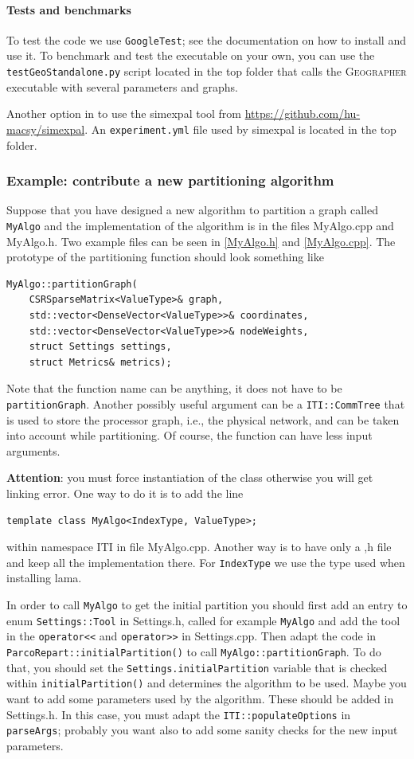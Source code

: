 \documentclass[a4paper,10pt]{article}
\newcommand{\geo}{\textsc{Geographer} }
\newcommand{\att}{\textbf{Attention}: }
\newcommand{\MI}[1]{\texttt{#1}}
\begin{document}
\paragraph{Tests and benchmarks}
To test the code we use \texttt{GoogleTest}; see the documentation on how to install and use it.
To benchmark and test the executable on your own, you can use the \texttt{testGeoStandalone.py}
script located in the top folder that calls the \geo executable with several parameters
and graphs.

Another option in to use the simexpal tool from \url{https://github.com/hu-macsy/simexpal}.
An \texttt{experiment.yml} file used by simexpal is located in the top folder.


\subsubsection*{Example: contribute a new partitioning algorithm}

Suppose that you have designed a new algorithm to partition a graph called \MI{MyAlgo}
and the implementation of the algorithm is in the files MyAlgo.cpp and MyAlgo.h. Two example files
can be seen in \cref{MyAlgo.h} and \cref{MyAlgo.cpp}.
The prototype of the partitioning function should look something like
\begin{verbatim}
MyAlgo::partitionGraph( 
    CSRSparseMatrix<ValueType>& graph,
    std::vector<DenseVector<ValueType>>& coordinates,
    std::vector<DenseVector<ValueType>>& nodeWeights,
    struct Settings settings,
    struct Metrics& metrics);
\end{verbatim}

Note that the function name can be anything, it does not have to be \MI{partitionGraph}. Another 
possibly useful argument can be a \MI{ITI::CommTree} that is used to store the processor
graph, i.e., the physical network, and can be taken into account while partitioning. Of course,
the function can have less input arguments.

\att you must force instantiation of the class otherwise you will get linking error.
One way to do it is to add the line 
\begin{verbatim}
template class MyAlgo<IndexType, ValueType>;
\end{verbatim}
within namespace ITI in file MyAlgo.cpp.
Another way is to have only a ,h file and keep all the implementation there.
For \MI{IndexType} we use the type used when installing lama.

In order to call \MI{MyAlgo} to get the initial partition you should first add an entry to enum
\MI{Settings::Tool} in Settings.h,
called for example \MI{MyAlgo} and add the tool in the \MI{operator<<} and \MI{operator>>} in
Settings.cpp.
Then adapt the code in \MI{ParcoRepart::initialPartition()} to call \MI{MyAlgo::partitionGraph}. 
To do that, you should set the \MI{Settings.initialPartition}
variable that is checked within \MI{initialPartition()} and determines the algorithm to be used.
Maybe you want to add some parameters used by the algorithm. These should be added in Settings.h.
In this case, you must adapt the \MI{ITI::populateOptions} in \MI{parseArgs}; probably you want also 
to add some sanity checks for the new input parameters.
\end{document}
